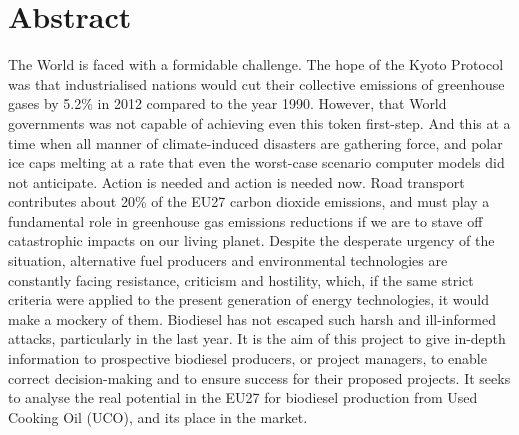 \documentclass[11pt,fleqn]{book} %
\begin{document}
\section{Abstract}
The World is faced with a formidable challenge. The hope of the Kyoto Protocol was that
industrialised nations would cut their collective emissions of greenhouse gases by 5.2\% in
2012 compared to the year 1990. However, that World governments was
not capable of achieving even this token first-step. And this at a time when all manner of
climate-induced disasters are gathering force, and polar ice caps melting at a rate that even
the worst-case scenario computer models did not anticipate.
Action is needed and action is needed now. Road transport contributes about 20\% of the
EU27 carbon dioxide emissions, and must play a fundamental role in greenhouse gas
emissions reductions if we are to stave off catastrophic impacts on our living planet. Despite
the desperate urgency of the situation, alternative fuel producers and environmental
technologies are constantly facing resistance, criticism and hostility, which, if the same strict
criteria were applied to the present generation of energy technologies, it would make a
mockery of them. Biodiesel has not escaped such harsh and ill-informed attacks, particularly
in the last year.
It is the aim of this project to give in-depth information to prospective biodiesel producers,
or project managers, to enable correct decision-making and to ensure success for their
proposed projects. It seeks to analyse the real potential in the EU27 for biodiesel production
from Used Cooking Oil (UCO), and its place in the market.


\end{document}
